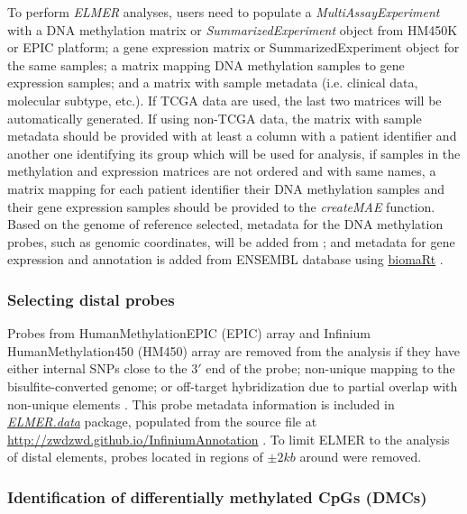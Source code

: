 To perform \textit{ELMER} analyses, users need to populate a \textit{MultiAssayExperiment} with a DNA methylation matrix or \textit{SummarizedExperiment} object from HM450K or EPIC platform; a gene expression matrix or SummarizedExperiment object for the same samples; a matrix mapping DNA methylation samples to gene expression samples; and a matrix with sample metadata (i.e. clinical data, molecular subtype, etc.). If TCGA data are used, the last two matrices will be automatically generated.
If using non-TCGA data, the matrix with sample metadata should be provided with at least a column with a patient identifier and another one identifying its group which will be used for analysis, if samples in the methylation and expression matrices are not ordered and with same names, a matrix mapping for each patient identifier their DNA methylation samples and their gene expression samples should be provided to the \textit{createMAE} function.
Based on the genome of reference selected, metadata for the DNA methylation probes, such as genomic coordinates, will be added from   \href{http://zwdzwd.github.io/InfiniumAnnotation}{}; 
and metadata for gene expression and annotation is added from ENSEMBL database \cite{yates2015ensembl} using \href{http://bioconductor.org/packages/biomaRt/}{biomaRt}
\cite{durinck2009mapping}. 

\subsubsection{Selecting distal probes} 
Probes from HumanMethylationEPIC (EPIC) array and Infinium HumanMethylation450 (HM450) array are removed from the analysis if they have either internal SNPs close to the $3'$ end of the probe; non-unique mapping to the bisulfite-converted genome; or off-target hybridization due to partial overlap with non-unique elements \cite{doi:10.1093/nar/gkw967}. This probe metadata information is
included in \href{https://github.com/tiagochst/ELMER.data}{\textit{ELMER.data}} package, populated from the source file at \url{http://zwdzwd.github.io/InfiniumAnnotation} \cite{doi:10.1093/nar/gkw967}.
To limit ELMER to the analysis of distal elements, probes located in regions of $\pm2 kb$ around  were removed.

\subsubsection{Identification of differentially methylated CpGs (DMCs)}

